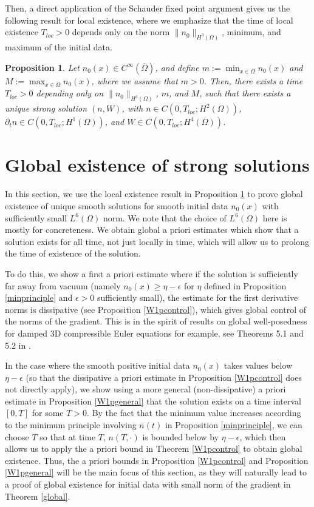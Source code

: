\documentclass[12pt]{article}
\theoremstyle{plain}
\newtheorem{proposition}{Proposition}[section]
\begin{document}
Then, a direct application of the Schauder fixed point argument gives us the following result for local existence, where we emphasize that the time of local existence $T_{loc} > 0$ depends only on the norm $\|n_{0}\|_{H^{3}(\Omega)}$, minimum, and maximum of the initial data.

\begin{proposition}\label{localexistence}
    Let $n_{0}(x) \in C^{\infty}(\overline{\Omega})$, and define $m := \min_{x \in \overline{\Omega}} n_{0}(x)$ and $M := \max_{x \in \overline{\Omega}} n_{0}(x)$,     where we assume that $m > 0$. Then, there exists a time $T_{loc} > 0$ depending only on $\|n_{0}\|_{H^{3}(\Omega)}$, $m$, and $M$, such that there exists a unique strong solution $(n, W)$, with $n \in C(0, T_{loc}; H^{2}(\Omega))$, $\partial_{t}n \in C(0, T_{loc}; H^{1}(\Omega))$, and $W \in C(0, T_{loc}; H^{4}(\Omega))$. 
\end{proposition}

\section{Global existence of strong solutions}\label{globalsec}

In this section, we use the local existence result in Proposition \ref{localexistence} to prove global existence of unique smooth solutions for smooth initial data $n_{0}(x)$ with sufficiently small $L^{6}(\Omega)$ norm. We note that the choice of $L^{6}(\Omega)$ here is mostly for concreteness. We obtain global a priori estimates which show that a solution exists for all time, not just locally in time, which will allow us to prolong the time of existence of the solution. 

To do this, we show a first a priori estimate where if the solution is sufficiently far away from vacuum (namely $n_{0}(x) \ge \eta - \epsilon$ for $\eta$ defined in Proposition \ref{minprinciple} and $\epsilon > 0$ sufficiently small), the estimate for the first derivative norms is dissipative (see Proposition \ref{W1pcontrol}), which gives global control of the norms of the gradient. This is in the spirit of results on global well-posedness for damped 3D compressible Euler equations for example, see Theorems 5.1 and 5.2 in \cite{Sideris}. 

In the case where the smooth positive initial data $n_{0}(x)$ takes values below $\eta - \epsilon$ (so that the dissipative a priori estimate in Proposition \ref{W1pcontrol} does not directly apply), we show using a more general (non-dissipative) a priori estimate in Proposition \ref{W1pgeneral} that the solution exists on a time interval $[0, T]$ for some $T > 0$. By the fact that the minimum value increases according to the minimum principle involving $\overline{n}(t)$ in Proposition \ref{minprinciple}, we can choose $T$ so that at time $T$, $n(T, \cdot)$ is bounded below by $\eta - \epsilon$, which then allows us to apply the a priori bound in Theorem \ref{W1pcontrol} to obtain global existence. Thus, the a priori bounds in Proposition \ref{W1pcontrol} and Proposition \ref{W1pgeneral} will be the main focus of this section, as they will naturally lead to a proof of global existence for initial data with small norm of the gradient in Theorem \ref{global}.
\end{document}
